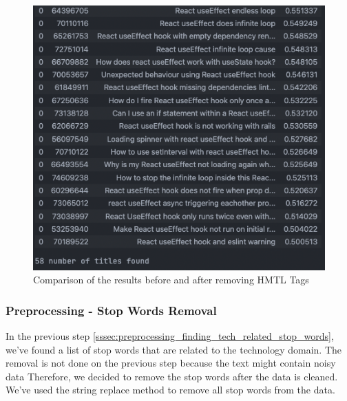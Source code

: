 \begin{figure}[H]
  \noindent \includegraphics[scale=0.45]{assets/spacy-query-1-results-1.png}
\caption{Comparison of the results before and after removing HMTL Tags }\label{html_comparison}
\end{figure}

\subsubsection{Preprocessing - Stop Words Removal}
In the previous step \ref{sssec:preprocessing_finding_tech_related_stop_words},  we've found a list of stop words that are related to the technology domain. The removal is not done on the previous step because the text might contain noisy data Therefore, we decided to remove the stop words after the data is cleaned. We've used the string replace method to remove all stop words from the data.

